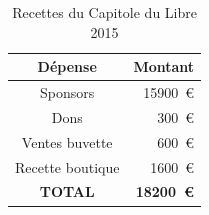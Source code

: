 \begin{table}
\begin{center}
    \caption{Recettes du Capitole du Libre 2015}\label{tab_recettes}
    \begin{tabular}{|c|r|}
        \hline Dépense & Montant \\
        \hline Sponsors & \SI{15900}{€} \\
        \hline Dons & \SI{300}{€} \\
        \hline Ventes buvette & \SI{600}{€} \\
        \hline Recette boutique & \SI{1600}{€} \\
        \hline \textbf{TOTAL} & \textbf{\SI{18200}{€}} \\
        \hline
    \end{tabular}
\end{center}
\end{table}

